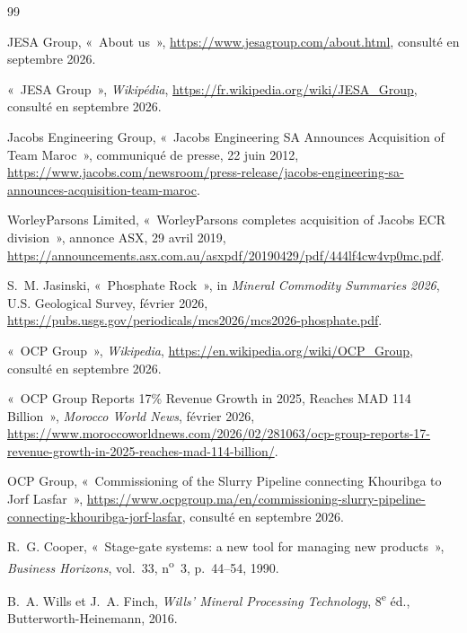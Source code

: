 \cleardoublepage
{}
{}
\begin{thebibliography}{99}
\small

 JESA Group, «~About us~», \url{https://www.jesagroup.com/about.html}, consulté en septembre 2026.

 «~JESA Group~», \textit{Wikipédia}, \url{https://fr.wikipedia.org/wiki/JESA_Group}, consulté en septembre 2026.

 Jacobs Engineering Group, «~Jacobs Engineering SA Announces Acquisition of Team Maroc~», communiqué de presse, 22 juin 2012, \url{https://www.jacobs.com/newsroom/press-release/jacobs-engineering-sa-announces-acquisition-team-maroc}.

 WorleyParsons Limited, «~WorleyParsons completes acquisition of Jacobs ECR division~», annonce ASX, 29 avril 2019, \url{https://announcements.asx.com.au/asxpdf/20190429/pdf/444lf4cw4vp0mc.pdf}.

 S.~M. Jasinski, «~Phosphate Rock~», in \textit{Mineral Commodity Summaries 2026}, U.S. Geological Survey, février 2026, \url{https://pubs.usgs.gov/periodicals/mcs2026/mcs2026-phosphate.pdf}.

 «~OCP Group~», \textit{Wikipedia}, \url{https://en.wikipedia.org/wiki/OCP_Group}, consulté en septembre 2026.

 «~OCP Group Reports 17\% Revenue Growth in 2025, Reaches MAD 114 Billion~», \textit{Morocco World News}, février 2026, \url{https://www.moroccoworldnews.com/2026/02/281063/ocp-group-reports-17-revenue-growth-in-2025-reaches-mad-114-billion/}.

 OCP Group, «~Commissioning of the Slurry Pipeline connecting Khouribga to Jorf Lasfar~», \url{https://www.ocpgroup.ma/en/commissioning-slurry-pipeline-connecting-khouribga-jorf-lasfar}, consulté en septembre 2026.

 R.~G. Cooper, «~Stage-gate systems: a new tool for managing new products~», \textit{Business Horizons}, vol.~33, n\textsuperscript{o}~3, p.~44--54, 1990.

 B.~A. Wills et J.~A. Finch, \textit{Wills' Mineral Processing Technology}, 8\textsuperscript{e} éd., Butterworth-Heinemann, 2016.


\end{thebibliography}
